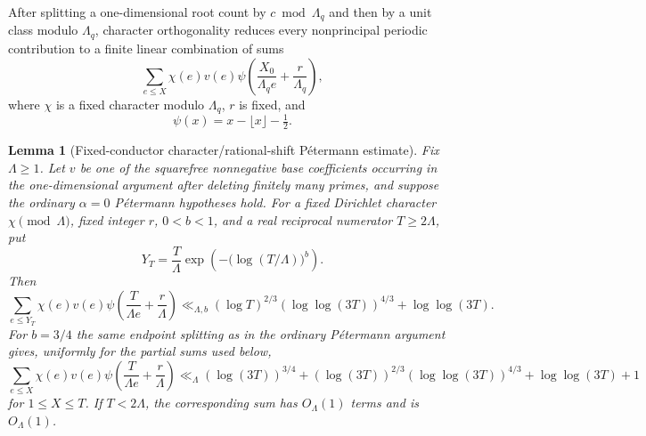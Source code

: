 \documentclass[11pt]{article}
\newtheorem{lemma}[theorem]{Lemma}
\theoremstyle{definition}
\theoremstyle{remark}
\newcommand{\1}{\mathbf 1}
\begin{document}
After splitting a one-dimensional root count by $c\bmod\Lambda_q$ and then
by a unit class modulo $\Lambda_q$, character orthogonality reduces every
nonprincipal periodic contribution to a finite linear combination of sums
\begin{equation}\label{eq:petermann-periodic}
\sum_{e\le X}\chi(e)v(e)
\psi\!\left(\frac{X_0}{\Lambda_q e}+\frac r{\Lambda_q}\right),
\end{equation}
where $\chi$ is a fixed character modulo $\Lambda_q$, $r$ is fixed, and
\[\psi(x)=x-\lfloor x\rfloor-\tfrac12.\]

\begin{lemma}[Fixed-conductor character/rational-shift P\'etermann estimate]\label{lem:fixed-conductor-petermann}
Fix $\Lambda\ge1$.  Let $v$ be one of the squarefree nonnegative base
coefficients occurring in the one-dimensional argument after deleting finitely
many primes, and suppose the ordinary $\alpha=0$ P\'etermann hypotheses hold.
For a fixed Dirichlet character $\chi\pmod\Lambda$, fixed integer $r$,
$0<b<1$, and a real reciprocal numerator $T\ge2\Lambda$, put
\[
 Y_T=\frac{T}{\Lambda}
 \exp\!\left(-\bigl(\log(T/\Lambda)\bigr)^b\right).
\]
Then
\[
 \sum_{e\le Y_T}\chi(e)v(e)
 \psi\!\left(\frac{T}{\Lambda e}+\frac r\Lambda\right)
 \ll_{\Lambda,b}
 (\log T)^{2/3}(\log\log(3T))^{4/3}+\log\log(3T).
\]
For $b=3/4$ the same endpoint splitting as in the ordinary P\'etermann argument
gives, uniformly for the partial sums used below,
\begin{equation}\label{eq:petermann-real-numerator}
 \sum_{e\le X}\chi(e)v(e)
 \psi\!\left(\frac{T}{\Lambda e}+\frac r\Lambda\right)
 \ll_{\Lambda}
 (\log(3T))^{3/4}
 +(\log(3T))^{2/3}(\log\log(3T))^{4/3}
 +\log\log(3T)+1
\end{equation}
for $1\le X\le T$.  If $T<2\Lambda$, the corresponding sum has
$O_\Lambda(1)$ terms and is $O_\Lambda(1)$.
\end{lemma}
\end{document}
